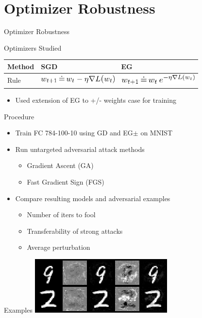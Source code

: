 \documentclass{beamer}
\begin{document}
	\section*{Optimizer Robustness}
	
	\begin{frame}{Optimizer Robustness}
		\begin{block}{Optimizers Studied}
			\begin{center}
				\begin{tabular}{ l | l | l }
					Method & SGD & EG \\ \hline
					Rule & \includegraphics[width=4cm]{sgd_rule} & \includegraphics[width=4cm]{eg_rule}
				\end{tabular}
			\end{center}
		\end{block}
		\begin{itemize}
			\item Used extension of EG to +/- weights case for training
		\end{itemize}
	\end{frame}
	
	\begin{frame}{Procedure}
		\begin{itemize}
			\item Train FC 784-100-10 using GD and EG$\pm$ on MNIST
			\item Run untargeted adversarial attack methods
			\begin{itemize}
				\item Gradient Ascent (GA)
				\item Fast Gradient Sign (FGS)
			\end{itemize}
			\item Compare resulting models and adversarial examples
			\begin{itemize}
				\item Number of iters to fool
				\item Transferability of strong attacks
				\item Average perturbation
			\end{itemize}
		\end{itemize}
	\end{frame}
	
	\begin{frame}{Examples}
		\centering
		\includegraphics[width=\textwidth]{mnist_attacks}
	\end{frame}
	
\end{document}
